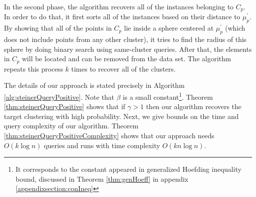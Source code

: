 \documentclass{article}
\begin{document}
In the second phase, the algorithm recovers all of the instances belonging to $C_p$. In order to do that, it first sorts all of the instances based on their distance to $\mu_p^\prime$. By showing that all of the points in $C_p$ lie inside a sphere centered at $\mu_p^\prime$ (which does not include points from any other cluster), it tries to find the radius of this sphere by doing binary search using same-cluster queries. After that, the elements in $C_p$ will be located and can be removed from the data set. The algorithm repeats this process $k$ times to recover all of the clusters.



The details of our approach is stated precisely in Algorithm \ref{alg:steinerQueryPositive}. Note that $\beta$ is a small constant\footnote{It corresponds to the constant appeared in generalized Hoefding inequality bound, discussed in Theorem \ref{thm:genHoeff} in appendix \ref{appendixsection:conIneq}}. Theorem \ref{thm:steinerQueryPositive} shows that if $\gamma > 1$ then our algorithm recovers the target clustering with high probability. Next, we give bounds on the time and query complexity of our algorithm. Theorem \ref{thm:steinerQueryPositiveComplexity} shows that our approach needs $O(k\log n)$ queries and runs with time complexity $O(kn\log n)$.
\end{document}
